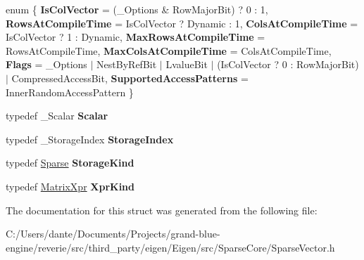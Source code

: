 \begin{DoxyCompactItemize}
\item 
\mbox{\label{struct_eigen_1_1internal_1_1traits_3_01_sparse_vector_3_01___scalar_00_01___options_00_01___storage_index_01_4_01_4_a6704ef8fe9c932ea1c2143bc2bb7e423}} 
enum \{ \newline
{\bfseries Is\+Col\+Vector} = (\+\_\+\+Options \& Row\+Major\+Bit) ? 0 \+: 1, 
{\bfseries Rows\+At\+Compile\+Time} = Is\+Col\+Vector ? Dynamic \+: 1, 
{\bfseries Cols\+At\+Compile\+Time} = Is\+Col\+Vector ? 1 \+: Dynamic, 
{\bfseries Max\+Rows\+At\+Compile\+Time} = Rows\+At\+Compile\+Time, 
\newline
{\bfseries Max\+Cols\+At\+Compile\+Time} = Cols\+At\+Compile\+Time, 
{\bfseries Flags} = \+\_\+\+Options $\vert$ Nest\+By\+Ref\+Bit $\vert$ Lvalue\+Bit $\vert$ (Is\+Col\+Vector ? 0 \+: Row\+Major\+Bit) $\vert$ Compressed\+Access\+Bit, 
{\bfseries Supported\+Access\+Patterns} = Inner\+Random\+Access\+Pattern
 \}
\item 
\mbox{\label{struct_eigen_1_1internal_1_1traits_3_01_sparse_vector_3_01___scalar_00_01___options_00_01___storage_index_01_4_01_4_a82769d78cf75ea2316a85d621bedbff3}} 
typedef \+\_\+\+Scalar {\bfseries Scalar}
\item 
\mbox{\label{struct_eigen_1_1internal_1_1traits_3_01_sparse_vector_3_01___scalar_00_01___options_00_01___storage_index_01_4_01_4_aec42d69562b56c18622a9f6c68819227}} 
typedef \+\_\+\+Storage\+Index {\bfseries Storage\+Index}
\item 
\mbox{\label{struct_eigen_1_1internal_1_1traits_3_01_sparse_vector_3_01___scalar_00_01___options_00_01___storage_index_01_4_01_4_a45df209a997a71525a21af75e046cf35}} 
typedef \mbox{\hyperlink{struct_eigen_1_1_sparse}{Sparse}} {\bfseries Storage\+Kind}
\item 
\mbox{\label{struct_eigen_1_1internal_1_1traits_3_01_sparse_vector_3_01___scalar_00_01___options_00_01___storage_index_01_4_01_4_a7766d0c43155ec85950124548de9f661}} 
typedef \mbox{\hyperlink{struct_eigen_1_1_matrix_xpr}{Matrix\+Xpr}} {\bfseries Xpr\+Kind}
\end{DoxyCompactItemize}


The documentation for this struct was generated from the following file\+:\begin{DoxyCompactItemize}
\item 
C\+:/\+Users/dante/\+Documents/\+Projects/grand-\/blue-\/engine/reverie/src/third\+\_\+party/eigen/\+Eigen/src/\+Sparse\+Core/Sparse\+Vector.\+h\end{DoxyCompactItemize}
